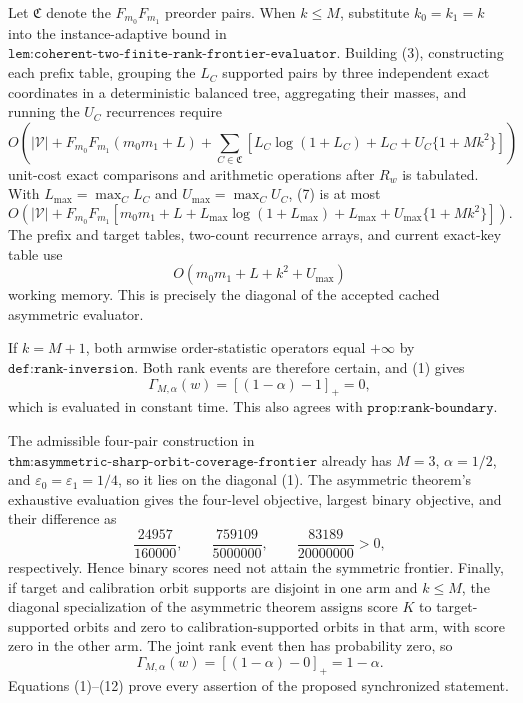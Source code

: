 Let \(\mathfrak C\) denote the \(F_{m_0}F_{m_1}\) preorder pairs. When \(k\le M\), substitute \(k_0=k_1=k\) into the instance-adaptive bound in \(\texttt{lem:coherent-two-finite-rank-frontier-evaluator}\). Building (3), constructing each prefix table, grouping the \(L_C\) supported pairs by three independent exact coordinates in a deterministic balanced tree, aggregating their masses, and running the \(U_C\) recurrences require
\[
O\!\left(
|\mathcal V|+F_{m_0}F_{m_1}(m_0m_1+L)+\sum_{C\in\mathfrak C}\left[L_C\log(1+L_C)+L_C+U_C\{1+Mk^2\}\right]
\right)
\tag{7}
\]
unit-cost exact comparisons and arithmetic operations after \(R_w\) is tabulated. With \(L_{\max}=\max_C L_C\) and \(U_{\max}=\max_C U_C\), (7) is at most
\[
O\!\left(|\mathcal V|+F_{m_0}F_{m_1}\left[m_0m_1+L+L_{\max}\log(1+L_{\max})+L_{\max}+U_{\max}\{1+Mk^2\}\right]\right).
\tag{8}
\]
The prefix and target tables, two-count recurrence arrays, and current exact-key table use
\[
O(m_0m_1+L+k^2+U_{\max})
\tag{9}
\]
working memory. This is precisely the diagonal of the accepted cached asymmetric evaluator.

If \(k=M+1\), both armwise order-statistic operators equal \(+\infty\) by \(\texttt{def:rank-inversion}\). Both rank events are therefore certain, and (1) gives
\[
\Gamma_{M,\alpha}(w)=[(1-\alpha)-1]_+=0,
\tag{10}
\]
which is evaluated in constant time. This also agrees with \(\texttt{prop:rank-boundary}\).

The admissible four-pair construction in \(\texttt{thm:asymmetric-sharp-orbit-coverage-frontier}\) already has \(M=3\), \(\alpha=1/2\), and \(\varepsilon_0=\varepsilon_1=1/4\), so it lies on the diagonal (1). The asymmetric theorem's exhaustive evaluation gives the four-level objective, largest binary objective, and their difference as
\[
\frac{24957}{160000},\qquad \frac{759109}{5000000},\qquad \frac{83189}{20000000}>0,
\tag{11}
\]
respectively. Hence binary scores need not attain the symmetric frontier. Finally, if target and calibration orbit supports are disjoint in one arm and \(k\le M\), the diagonal specialization of the asymmetric theorem assigns score \(K\) to target-supported orbits and zero to calibration-supported orbits in that arm, with score zero in the other arm. The joint rank event then has probability zero, so
\[
\Gamma_{M,\alpha}(w)=[(1-\alpha)-0]_+=1-\alpha.
\tag{12}
\]
Equations (1)--(12) prove every assertion of the proposed synchronized statement.